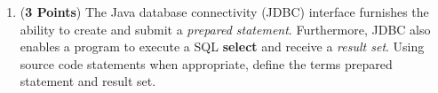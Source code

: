 \documentclass[12pt]{article}
\begin{document}
\begin{enumerate}
\begin{enumerate}
                  \item ({\bf 3 Points}) The Java database connectivity (JDBC) interface
                    furnishes the ability to create and submit a {\em prepared
                    statement}.  Furthermore, JDBC also enables a program to execute a
                    SQL {\bf select} and receive a {\em result set}.  Using source code
                    statements when appropriate, define the terms prepared statement and
                    result set.


                    \end{enumerate}

                \end{enumerate}

                
\end{document}
